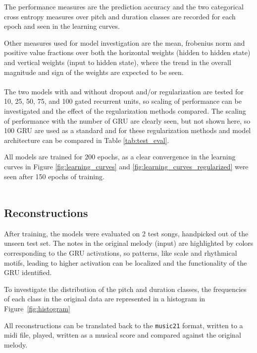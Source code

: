 The performance measures are the prediction accuracy and the two categorical cross entropy measures over pitch and duration classes are recorded for each epoch and seen in the learning curves.

Other measures used for model investigation are the mean, frobenius norm and positive value fractions over both the horizontal weights (hidden to hidden state) and vertical weights (input to hidden state), where the trend in the overall magnitude and sign of the weights are expected to be seen. \\ \\


The two models with and without dropout and/or regularization are tested for 10, 25, 50, 75, and 100 gated recurrent units, so scaling of performance can be investigated and the effect of the regularization methods compared. The scaling of performance with the number of GRU are clearly seen, but not shown here, so 100 GRU are used as a standard and for these regularization methods and model architecture can be compared in Table \ref{tab:test_eval}.

All models are trained for 200 epochs, as a clear convergence in the learning curves in Figure \ref{fig:learning_curves} and \ref{fig:learning_curves_regularized} were seen after 150 epochs of training. \\ \\

\subsection{Reconstructions}

After training, the models were evaluated on 2 test songs, handpicked out of the unseen test set. The notes in the original melody (input) are highlighted by colors corresponding to the GRU activations, so patterns, like scale and rhythmical motifs, leading to higher activation can be localized and the functionality of the GRU identified.

To investigate the distribution of the pitch and duration classes, the frequencies of each class in the original data are represented in a histogram in Figure~\ref{fig:histogram}

All reconstructions can be translated back to the \texttt{music21} format, written to a midi file, played, written as a musical score and compared against the original melody.

